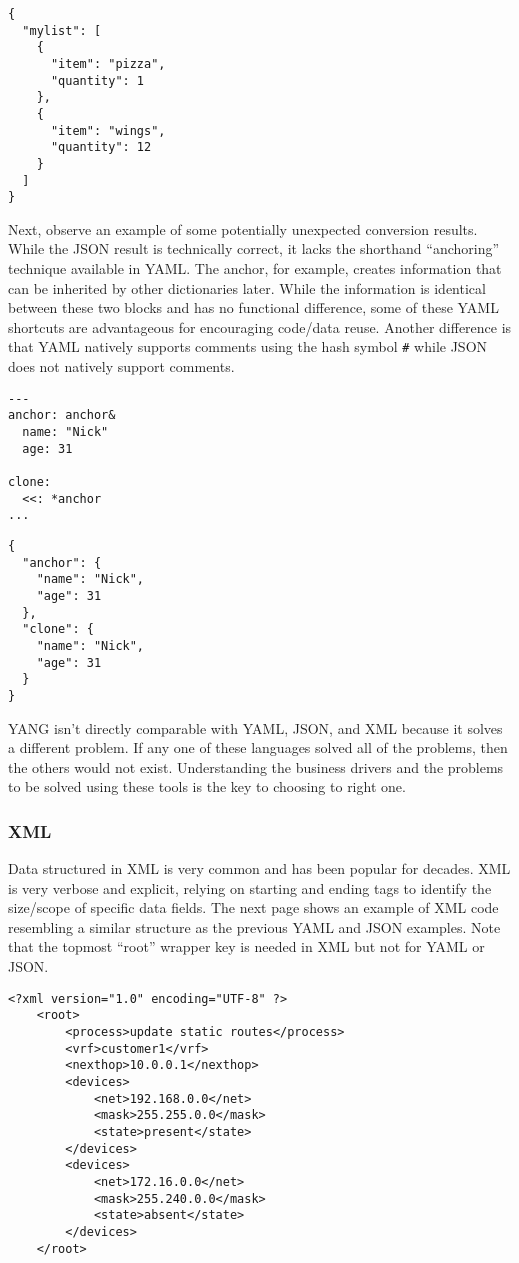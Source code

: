 \begin{verbatim}
{
  "mylist": [
    {
      "item": "pizza",
      "quantity": 1
    },
    {
      "item": "wings",
      "quantity": 12
    }
  ]
}
\end{verbatim}

Next, observe an example of some potentially unexpected conversion results.
While the JSON result is technically correct, it lacks the shorthand
``anchoring'' technique available in YAML\@. The anchor, for example, creates
information that can be inherited by other dictionaries later. While the
information is identical between these two blocks and has no functional
difference, some of these YAML shortcuts are advantageous for encouraging
code/data reuse. Another difference is that YAML natively supports comments
using the hash symbol \verb|#| while JSON does not natively support comments.

\begin{verbatim}
---
anchor: anchor&
  name: "Nick"
  age: 31

clone:
  <<: *anchor
...
\end{verbatim}

\begin{verbatim}
{
  "anchor": {
    "name": "Nick",
    "age": 31
  },
  "clone": {
    "name": "Nick",
    "age": 31
  }
}
\end{verbatim}

YANG isn’t directly comparable with YAML, JSON, and XML because it solves a
different problem. If any one of these languages solved all of the problems,
then the others would not exist. Understanding the business drivers and the
problems to be solved using these tools is the key to choosing to right one.

\subsubsection{XML}
Data structured in XML is very common and has been popular for decades. XML is
very verbose and explicit, relying on starting and ending tags to identify the
size/scope of specific data fields. The next page shows an example of XML code
resembling a similar structure as the previous YAML and JSON examples. Note
that the topmost ``root'' wrapper key is needed in XML but not for YAML or JSON\@.

\begin{verbatim}
<?xml version="1.0" encoding="UTF-8" ?>
	<root>
		<process>update static routes</process>
		<vrf>customer1</vrf>
		<nexthop>10.0.0.1</nexthop>
		<devices>
			<net>192.168.0.0</net>
			<mask>255.255.0.0</mask>
			<state>present</state>
		</devices>
		<devices>
			<net>172.16.0.0</net>
			<mask>255.240.0.0</mask>
			<state>absent</state>
		</devices>
	</root>
\end{verbatim}
